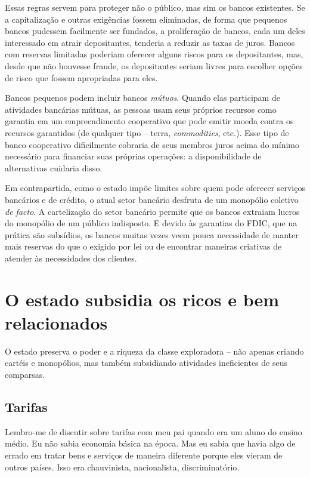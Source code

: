 Essas regras servem para proteger não o público, mas sim os bancos existentes. Se a capitalização e outras exigências fossem eliminadas, de forma que pequenos bancos pudessem facilmente ser fundados, a proliferação de bancos, cada um deles interessado em atrair depositantes, tenderia a reduzir as taxas de juros. Bancos com reservas limitadas poderiam oferecer alguns riscos para os depositantes, mas, desde que não houvesse fraude, os depositantes seriam livres para escolher opções de risco que fossem apropriadas para eles.

Bancos pequenos podem incluir bancos \emph{mútuos}. Quando elas participam de atividades bancárias mútuas, as pessoas usam seus próprios recursos como garantia em um empreendimento cooperativo que pode emitir moeda contra os recursos garantidos (de qualquer tipo -- terra, \emph{commodities}, etc.). Esse tipo de banco cooperativo dificilmente cobraria de seus membros juros acima do mínimo necessário para financiar suas próprias operações: a disponibilidade de alternativas cuidaria disso.

Em contrapartida, como o estado impõe limites sobre quem pode oferecer serviços bancários e de crédito, o atual setor bancário desfruta de um monopólio coletivo \emph{de facto}. A cartelização do setor bancário permite que os bancos extraiam lucros do monopólio de um público indisposto. E devido às garantias do FDIC, que na prática são subsídios, os bancos muitas vezes veem pouca necessidade de manter mais reservas do que o exigido por lei ou de encontrar maneiras criativas de atender às necessidades dos clientes.

\section{O estado subsidia os ricos e bem relacionados}

O estado preserva o poder e a riqueza da classe exploradora -- não apenas criando cartéis e monopólios, mas também subsidiando atividades ineficientes de seus comparsas.

\subsection*{Tarifas}

Lembro-me de discutir sobre tarifas com meu pai quando era um aluno do ensino médio. Eu não sabia economia básica na época. Mas eu sabia que havia algo de errado em tratar bens e serviços de maneira diferente porque eles vieram de outros países. Isso era chauvinista, nacionalista, discriminatório.

